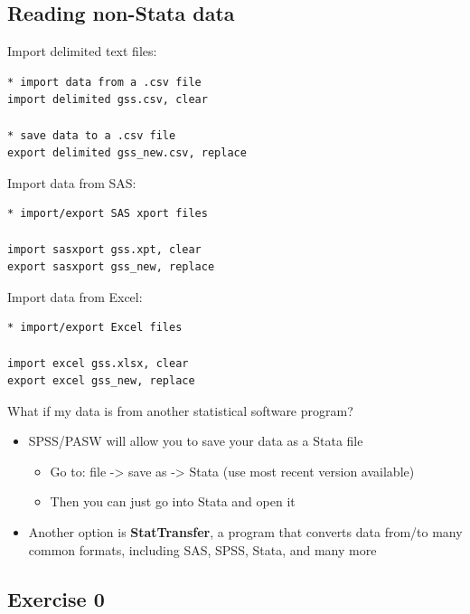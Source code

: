 \documentclass[]{book}
\providecommand{\tightlist}{%
  \setlength{\itemsep}{0pt}\setlength{\parskip}{0pt}}
\begin{document}
\hypertarget{reading-non-stata-data}{%
\subsection{Reading non-Stata data}\label{reading-non-stata-data}}

Import delimited text files:

\begin{verbatim}
* import data from a .csv file
import delimited gss.csv, clear

* save data to a .csv file
export delimited gss_new.csv, replace
\end{verbatim}

Import data from SAS:

\begin{verbatim}
* import/export SAS xport files

import sasxport gss.xpt, clear 
export sasxport gss_new, replace
\end{verbatim}

Import data from Excel:

\begin{verbatim}
* import/export Excel files

import excel gss.xlsx, clear 
export excel gss_new, replace
\end{verbatim}

What if my data is from another statistical software program?

\begin{itemize}
\tightlist
\item
  SPSS/PASW will allow you to save your data as a Stata file

  \begin{itemize}
  \tightlist
  \item
    Go to: file -\textgreater{} save as -\textgreater{} Stata (use most recent version available)
  \item
    Then you can just go into Stata and open it
  \end{itemize}
\item
  Another option is \textbf{StatTransfer}, a program that converts data from/to many common formats, including SAS, SPSS, Stata, and many more
\end{itemize}

\hypertarget{exercise-0-5}{%
\subsection{Exercise 0}\label{exercise-0-5}}
\end{document}
